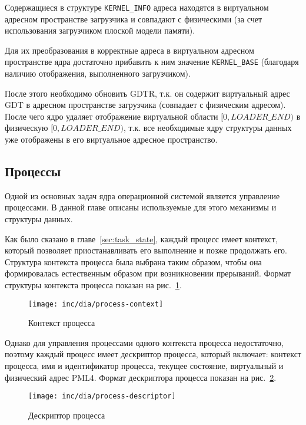 Содержащиеся в структуре \texttt{KERNEL\_INFO} адреса находятся в виртуальном адресном
пространстве загрузчика и совпадают с физическими (за счет использования загрузчиком плоской
модели памяти).

Для их преобразования в корректные адреса в виртуальном адресном пространстве ядра
достаточно прибавить к ним значение \texttt{KERNEL\_BASE} (благодаря наличию отображения,
выполненного загрузчиком).

После этого необходимо обновить GDTR, т.к. он содержит виртуальный адрес GDT в адресном
пространстве загрузчика (совпадает с физическим адресом). После чего ядро удаляет отображение
виртуальной области $[0, LOADER\_END)$ в физическую $[0, LOADER\_END)$, т.к. все необходимые
ядру структуры данных уже отображены в его виртуальное адресное пространство.

\subsection{Процессы}
Одной из основных задач ядра операционной системой является управление процессами. В данной
главе описаны используемые для этого механизмы и структуры данных.

Как было сказано в главе~\ref{sec:task_state}, каждый процесс имеет контекст, который позволяет
приостанавливать его выполнение и позже продолжать его. Структура контекста процесса была выбрана
таким образом, чтобы она формировалась естественным образом при возникновении прерываний. Формат
структуры контекста процесса показан на рис.~\ref{fig:process-context}.

\begin{figure}[ht!]
  \centering
  \texttt{[image: inc/dia/process-context]}
  \caption{Контекст процесса}
  \label{fig:process-context}
\end{figure}

Однако для управления процессами одного контекста процесса недостаточно, поэтому каждый
процесс имеет дескриптор процесса, который включает: контекст процесса, имя и идентификатор процесса,
текущее состояние, виртуальный и физический адрес PML4. Формат дескриптора процесса показан
на рис.~\ref{fig:process-descriptor}.

\begin{figure}[ht!]
  \centering
  \texttt{[image: inc/dia/process-descriptor]}
  \caption{Дескриптор процесса}
  \label{fig:process-descriptor}
\end{figure}

